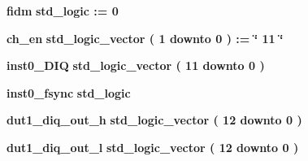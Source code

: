 \begin{DoxyCompactItemize}
\item 
{\bf fidm} {\bfseries \textcolor{comment}{std\+\_\+logic}\textcolor{vhdlchar}{ }\textcolor{vhdlchar}{ }\textcolor{vhdlchar}{\+:}\textcolor{vhdlchar}{=}\textcolor{vhdlchar}{ }\textcolor{vhdlchar}{ }\textcolor{vhdlchar}{\textquotesingle{}}\textcolor{vhdlchar}{ } \textcolor{vhdldigit}{0} \textcolor{vhdlchar}{ }\textcolor{vhdlchar}{\textquotesingle{}}\textcolor{vhdlchar}{ }} 
\item 
{\bf ch\+\_\+en} {\bfseries \textcolor{comment}{std\+\_\+logic\+\_\+vector}\textcolor{vhdlchar}{ }\textcolor{vhdlchar}{(}\textcolor{vhdlchar}{ }\textcolor{vhdlchar}{ } \textcolor{vhdldigit}{1} \textcolor{vhdlchar}{ }\textcolor{keywordflow}{downto}\textcolor{vhdlchar}{ }\textcolor{vhdlchar}{ } \textcolor{vhdldigit}{0} \textcolor{vhdlchar}{ }\textcolor{vhdlchar}{)}\textcolor{vhdlchar}{ }\textcolor{vhdlchar}{ }\textcolor{vhdlchar}{ }\textcolor{vhdlchar}{\+:}\textcolor{vhdlchar}{=}\textcolor{vhdlchar}{ }\textcolor{vhdlchar}{ }\textcolor{vhdlchar}{ }\textcolor{vhdlchar}{ }\textcolor{keyword}{\char`\"{} 11 \char`\"{}}\textcolor{vhdlchar}{ }} 
\item 
{\bf inst0\+\_\+\+D\+IQ} {\bfseries \textcolor{comment}{std\+\_\+logic\+\_\+vector}\textcolor{vhdlchar}{ }\textcolor{vhdlchar}{(}\textcolor{vhdlchar}{ }\textcolor{vhdlchar}{ } \textcolor{vhdldigit}{11} \textcolor{vhdlchar}{ }\textcolor{keywordflow}{downto}\textcolor{vhdlchar}{ }\textcolor{vhdlchar}{ } \textcolor{vhdldigit}{0} \textcolor{vhdlchar}{ }\textcolor{vhdlchar}{)}\textcolor{vhdlchar}{ }} 
\item 
{\bf inst0\+\_\+fsync} {\bfseries \textcolor{comment}{std\+\_\+logic}\textcolor{vhdlchar}{ }} 
\item 
{\bf dut1\+\_\+diq\+\_\+out\+\_\+h} {\bfseries \textcolor{comment}{std\+\_\+logic\+\_\+vector}\textcolor{vhdlchar}{ }\textcolor{vhdlchar}{(}\textcolor{vhdlchar}{ }\textcolor{vhdlchar}{ } \textcolor{vhdldigit}{12} \textcolor{vhdlchar}{ }\textcolor{keywordflow}{downto}\textcolor{vhdlchar}{ }\textcolor{vhdlchar}{ } \textcolor{vhdldigit}{0} \textcolor{vhdlchar}{ }\textcolor{vhdlchar}{)}\textcolor{vhdlchar}{ }} 
\item 
{\bf dut1\+\_\+diq\+\_\+out\+\_\+l} {\bfseries \textcolor{comment}{std\+\_\+logic\+\_\+vector}\textcolor{vhdlchar}{ }\textcolor{vhdlchar}{(}\textcolor{vhdlchar}{ }\textcolor{vhdlchar}{ } \textcolor{vhdldigit}{12} \textcolor{vhdlchar}{ }\textcolor{keywordflow}{downto}\textcolor{vhdlchar}{ }\textcolor{vhdlchar}{ } \textcolor{vhdldigit}{0} \textcolor{vhdlchar}{ }\textcolor{vhdlchar}{)}\textcolor{vhdlchar}{ }} 

\end{DoxyCompactItemize}
